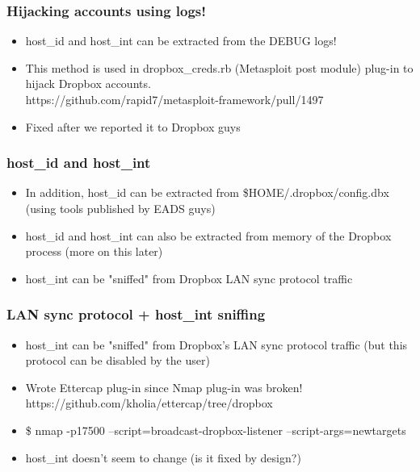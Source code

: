 \documentclass{beamer}
\newcommand\myfont{\fontsize{14}{20}\selectfont}
\begin{document}
\begin{frame}
\frametitle{Hijacking accounts using logs!}
\myfont
\begin{itemize}
\itemsep 1em
\item host\_id and host\_int can be extracted from the DEBUG logs!
\item This method is used in dropbox\_creds.rb (Metasploit post module) plug-in
to hijack Dropbox accounts. \\
 \vspace{1em} {\small https://github.com/rapid7/metasploit-framework/pull/1497}
\item Fixed after we reported it to Dropbox guys
\end{itemize}
\end{frame}

\begin{frame}
\frametitle{host\_id and host\_int}
\myfont
\begin{itemize}
\itemsep 1em
\item In addition, host\_id can be extracted from \$HOME/.dropbox/config.dbx (using tools published by EADS guys)
\item host\_id and host\_int can also be extracted from memory of the Dropbox process (more on this later)
\item host\_int can be "sniffed" from Dropbox LAN sync protocol traffic
\end{itemize}
\end{frame}

\begin{frame}
\frametitle{LAN sync protocol + host\_int sniffing}
\begin{itemize}
\itemsep 2em
\item host\_int can be "sniffed" from Dropbox's LAN sync protocol traffic (but this protocol can be disabled by the user)
\item Wrote Ettercap plug-in since Nmap plug-in was broken! \\
  \vspace{1em} https://github.com/kholia/ettercap/tree/dropbox
\item \$ nmap -p17500 --script=broadcast-dropbox-listener --script-args=newtargets
\item host\_int doesn't seem to change (is it fixed by design?)
\end{itemize}
\end{frame}
\end{document}
